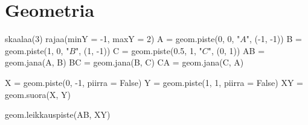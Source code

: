 \section{Geometria}
\begin{kuva}
skaalaa(3)
rajaa(minY = -1, maxY = 2)
A = geom.piste(0, 0, "$A$", (-1, -1))
B = geom.piste(1, 0, "$B$", (1, -1))
C = geom.piste(0.5, 1, "$C$", (0, 1))
AB = geom.jana(A, B)
BC = geom.jana(B, C)
CA = geom.jana(C, A)

X = geom.piste(0, -1, piirra = False)
Y = geom.piste(1, 1, piirra = False)
XY = geom.suora(X, Y)

geom.leikkauspiste(AB, XY)
\end{kuva}

